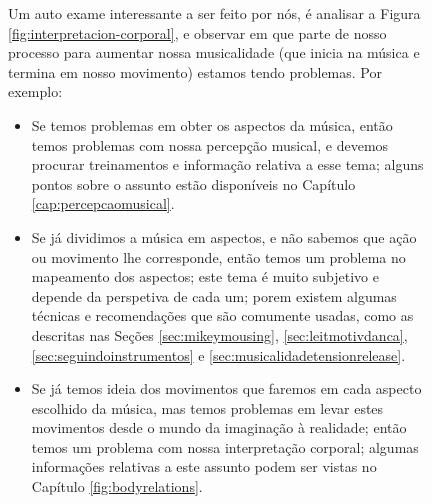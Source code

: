 \begin{figure}[!h]
\begin{elaboracion}[title=Nossos problemas com a musicalidade]
Um auto exame interessante a ser feito por nós, é analisar a Figura \ref{fig:interpretacion-corporal},
e observar em que parte de  nosso processo para aumentar nossa musicalidade  
(que inicia na música e termina em nosso movimento) estamos tendo problemas. Por exemplo:
\begin{itemize}
\item Se temos problemas em obter os aspectos da música, 
então temos problemas com nossa percepção musical,
e devemos procurar treinamentos e informação relativa a esse tema;
alguns pontos sobre o assunto estão disponíveis no Capítulo \ref{cap:percepcaomusical}.
\item Se já dividimos a música em aspectos, e não sabemos que ação ou movimento lhe corresponde,
então temos um problema no mapeamento dos aspectos;
este tema é muito subjetivo e depende da perspetiva de cada um;
porem existem algumas técnicas e recomendações que são comumente usadas,
como as descritas nas Seções \ref{sec:mikeymousing}, \ref{sec:leitmotivdanca}, 
\ref{sec:seguindoinstrumentos} e \ref{sec:musicalidadetensionrelease}.
\item Se já temos  ideia dos movimentos que faremos em cada aspecto escolhido da música,
mas temos problemas em levar estes movimentos desde o mundo da imaginação à realidade;
então temos um problema com nossa interpretação corporal;
algumas informações relativas a este assunto podem ser vistas no Capítulo  \ref{fig:bodyrelations}.
\end{itemize}
\end{elaboracion}
\label{fig:testemusicalidade}
\end{figure}

